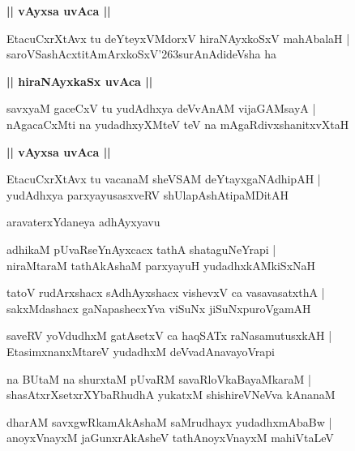 \documentclass[twoside,12pt,openright]{book}
\def\S{\char'263}
\newcounter{shloka}[chapter]
\def\uvaca#1{\centerline{{\large\textbf{#1}}}}
\begin{document}
\uvaca{|| vAyxsa uvAca ||}

\begin{shloka}%
EtacuCxrXtAvx tu deYteyxVMdorxV hiraNAyxkoSxV mahAbalaH |\\
saroVSashAcxtitAmArxkoSxV\S surAnAdideVsha ha 
\end{shloka}

\uvaca{|| hiraNAyxkaSx uvAca ||}

\begin{shloka}%
savxyaM gaceCxV tu yudAdhxya deVvAnAM vijaGAMsayA |\\
nAgacaCxMti na yudadhxyXMteV teV na mAgaRdivxshanitxvXtaH 
\end{shloka}

\uvaca{|| vAyxsa uvAca ||}

\begin{shloka}%
EtacuCxrXtAvx tu vacanaM sheVSAM deYtayxgaNAdhipAH |\\
yudAdhxya parxyayusasxveRV shUlapAshAtipaMDitAH 
\end{shloka}

\begin{center}
aravaterxYdaneya adhAyxyavu
\end{center}

\begin{shloka}%
adhikaM pUvaRseYnAyxcacx tathA shataguNeYrapi |\\
niraMtaraM tathAkAshaM parxyayuH yudadhxkAMkiSxNaH 
\end{shloka}

\begin{shloka}%
tatoV rudArxshacx sAdhAyxshacx vishevxV ca vasavasatxthA |\\
sakxMdashacx gaNapashecxYva viSuNx jiSuNxpuroVgamAH
\end{shloka}

\begin{shloka}%
saveRV yoVdudhxM gatAsetxV ca haqSATx raNasamutusxkAH |\\
EtasimxnanxMtareV yudadhxM deVvadAnavayoVrapi 
\end{shloka}

\begin{shloka}%
na BUtaM na shurxtaM pUvaRM savaRloVkaBayaMkaraM |\\
shasAtxrXsetxrXYbaRhudhA yukatxM shishireVNeVva kAnanaM 
\end{shloka}

\begin{shloka}%
dharAM savxgwRkamAkAshaM saMrudhayx yudadhxmAbaBw |\\
anoyxVnayxM jaGunxrAkAsheV tathAnoyxVnayxM mahiVtaLeV 
\end{shloka}
\end{document}

